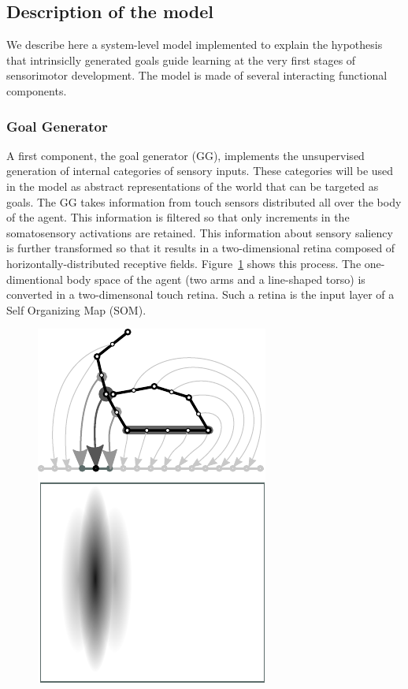 \subsection{Description of the model}
\label{sec:Description}


We describe here a system-level model implemented to explain the hypothesis that intrinsiclly generated goals guide learning at the very first stages of sensorimotor development. 
%
The model is made of several interacting functional components.  
%
\subsubsection{Goal Generator} 
\label{sec:goal_generator}
A first component, the goal generator (GG), implements the unsupervised generation of internal categories of sensory inputs. These categories will be used in the model as abstract representations of the world that can be targeted as goals. The GG takes information from touch sensors distributed all over the body of the agent. This information is filtered so that only increments in the somatosensory activations are retained. This information about sensory saliency is further transformed so that it results in a two-dimensional retina composed of horizontally-distributed receptive fields. Figure~\ref{fig:sensory-input} shows this process. The one-dimentional body space of the agent (two arms and a line-shaped torso) is converted in a two-dimensonal touch retina. 
%
Such a retina is the input layer of a Self Organizing Map (SOM).
\begin{figure}[htp]
\centering
\includegraphics[scale=1.0]{sensoryinput}
\caption{}
\label{fig:sensory-input}
\end{figure}
